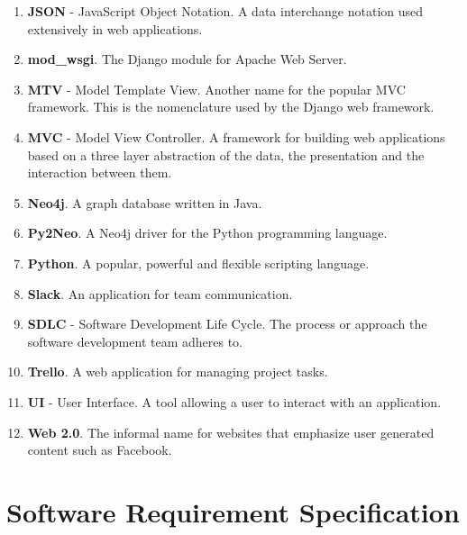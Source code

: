 \documentclass[12pt,onecolumn]{article}
\begin{document}
\begin{enumerate}
		\item \textbf{JSON} - JavaScript Object Notation. A data interchange notation used extensively in web applications.

		\item \textbf{mod\_wsgi}. The Django module for Apache Web Server.

		\item \textbf{MTV} - Model Template View. Another name for the popular MVC framework. This is the nomenclature used by the Django web framework.

		\item \textbf{MVC} - Model View Controller. A framework for building web applications based on a three layer abstraction of the data, the presentation and the interaction between them. 

		\item \textbf{Neo4j}. A graph database written in Java.

		\item \textbf{Py2Neo}. A Neo4j driver for the Python programming language.

		\item \textbf{Python}. A popular, powerful and flexible scripting language.

		\item \textbf{Slack}. An application for team communication.

		\item \textbf{SDLC} - Software Development Life Cycle. The process or approach the software development team adheres to.

		\item \textbf{Trello}. A web application for managing project tasks.

		\item \textbf{UI} - User Interface. A tool allowing a user to interact with an application.

		\item \textbf{Web 2.0}. The informal name for websites that emphasize user generated content such as Facebook.


	\end{enumerate}

\section{Software Requirement Specification} %
\end{document}
